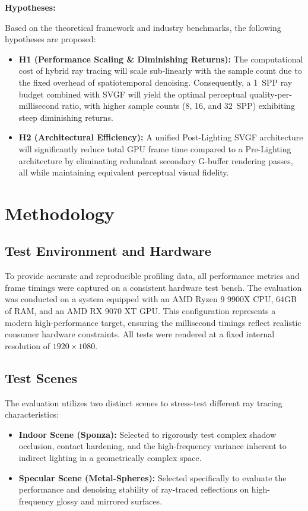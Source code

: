 \documentclass[12pt,a4paper]{report}
\newcommand{\daesection}[1]{
  \section{#1}
}
\begin{document}
\vspace{1em}

\textbf{Hypotheses:}

Based on the theoretical framework and industry benchmarks, the following hypotheses are proposed:
\begin{itemize}
    \item \textbf{H1 (Performance Scaling \& Diminishing Returns):} The computational cost of hybrid ray tracing will scale sub-linearly with the sample count due to the fixed overhead of spatiotemporal denoising.
     Consequently, a 1~SPP ray budget combined with SVGF will yield the optimal perceptual quality-per-millisecond ratio, with higher sample counts (8, 16, and 32~SPP) exhibiting steep diminishing returns.
    \item \textbf{H2 (Architectural Efficiency):} A unified Post-Lighting SVGF architecture will significantly reduce total GPU frame time compared to a Pre-Lighting architecture by eliminating redundant secondary G-buffer rendering passes,
     all while maintaining equivalent perceptual visual fidelity.
\end{itemize}


\daesection{Methodology}

\subsection{Test Environment and Hardware}
To provide accurate and reproducible profiling data, all performance metrics and frame timings were captured on a consistent hardware test bench. The evaluation was conducted on a system equipped with an AMD Ryzen 9 9900X CPU, 64GB of RAM, and an AMD RX 9070 XT GPU. This configuration represents a modern high-performance target,
ensuring the millisecond timings reflect realistic consumer hardware constraints. All tests were rendered at a fixed internal resolution of $1920 \times 1080$.

\subsection{Test Scenes}
The evaluation utilizes two distinct scenes to stress-test different ray tracing characteristics:
\begin{itemize}
    \item \textbf{Indoor Scene (Sponza):} Selected to rigorously test complex shadow occlusion, contact hardening, and the high-frequency variance inherent to indirect lighting in a geometrically complex space.
    \item \textbf{Specular Scene (Metal-Spheres):} Selected specifically to evaluate the performance and denoising stability of ray-traced reflections on high-frequency glossy and mirrored surfaces.
\end{itemize}
\end{document}
